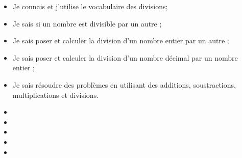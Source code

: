 \begin{myobj}
	\begin{itemize}
		\item Je connais et j'utilise le vocabulaire des divisions;
		\item Je sais si un nombre est divisible par un autre ;
		\item Je sais poser et calculer la division d’un nombre entier par un autre ;
		\item Je sais  poser et calculer la division d’un nombre décimal par un nombre entier ;
		\item Je sais résoudre des problèmes en utilisant des additions, soustractions, multiplications et divisions.
		
	\end{itemize}
\end{myobj}

\begin{mycomp}
	\begin{itemize}
			
			
			\item {} %
			\item {} %
			\item {} 
			\item {}
			\item {}
	\end{itemize}
\end{mycomp}